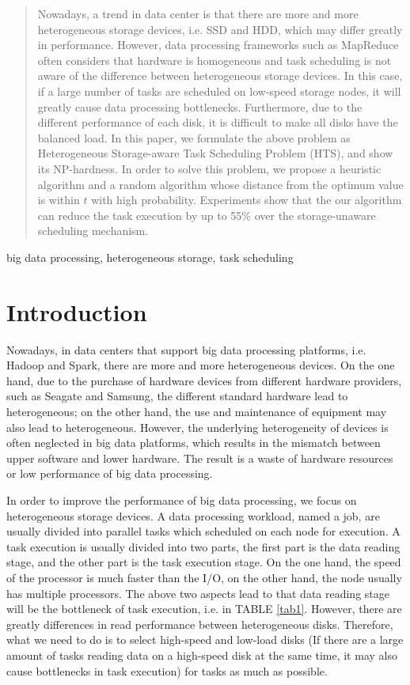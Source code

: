 \documentclass[conference]{IEEEtran}
\begin{document}
\begin{abstract}
Nowadays, a trend in data center is that there are more and more heterogeneous storage devices, i.e. SSD and HDD, which may differ greatly in performance. However, data processing frameworks such as MapReduce often considers that hardware is homogeneous and task scheduling is not aware of the difference between heterogeneous storage devices. In this case, if a large number of tasks are scheduled on low-speed storage nodes, it will greatly cause data processing bottlenecks. Furthermore, due to the different performance of each disk, it is difficult to make all disks have the balanced load. In this paper, we formulate the above problem as Heterogeneous Storage-aware Task Scheduling Problem (HTS), and show its NP-hardness. In order to solve this problem, we propose a heuristic algorithm and a random algorithm whose distance from the optimum value is within $t$ with high probability. Experiments show that the our algorithm can reduce the task execution by up to 55\% over the storage-unaware scheduling mechanism.
\end{abstract}

\begin{IEEEkeywords}
big data processing, heterogeneous storage, task scheduling
\end{IEEEkeywords}

\section{Introduction}

Nowadays, in data centers that support big data processing platforms, i.e. Hadoop\cite{b14} and Spark\cite{b15}, there are more and more heterogeneous devices. On the one hand, due to the purchase of hardware devices from different hardware providers, such as Seagate\cite{b16} and Samsung\cite{b17}, the different standard hardware  lead to heterogeneous; on the other hand, the use and maintenance of equipment may also lead to heterogeneous. However, the underlying heterogeneity of devices is often neglected in big data platforms, which results in the mismatch between upper software and lower hardware. The result is a waste of hardware resources or low performance of big data processing.

In order to improve the performance of big data processing, we focus on heterogeneous storage devices. A data processing workload, named a job, are usually divided into parallel tasks which scheduled on each node for execution. A task execution is usually divided into two parts, the first part is the data reading stage, and the other part is the task execution stage. On the one hand, the speed of the processor is much faster than the I/O, on the other hand, the node usually has multiple processors. The above two aspects lead to that data reading stage will be the bottleneck of task execution, i.e. in TABLE \ref{tab1}. However, there are greatly differences in read performance between heterogeneous disks. Therefore, what we need to do is to select high-speed and low-load disks (If there are a large amount of tasks reading data on a high-speed disk at the same time, it may also cause bottlenecks in task execution) for tasks as much as possible. 
\end{document}
